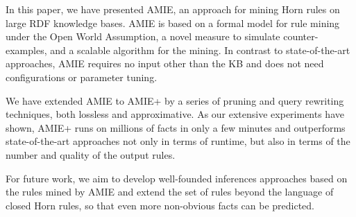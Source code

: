 
In this paper, we have presented AMIE, an approach for mining Horn rules on large RDF knowledge bases. AMIE is based on a formal model for rule mining under the Open World Assumption, a novel measure to simulate counter-examples, and a scalable algorithm for the mining. In contrast to state-of-the-art approaches, AMIE requires no input other than the KB and does not need configurations or parameter tuning.

We have extended AMIE to AMIE+ by a series of pruning and query rewriting techniques, both lossless and approximative.
As our extensive experiments have shown, AMIE+ runs on millions of facts in only a few minutes and outperforms state-of-the-art approaches not only in terms of runtime,
but also in terms of the number and quality of the output rules.

For future work, we aim to develop well-founded inferences approaches based on the rules mined by AMIE and 
extend the set of rules beyond the language of closed Horn rules,
so that even more non-obvious facts can be predicted.

